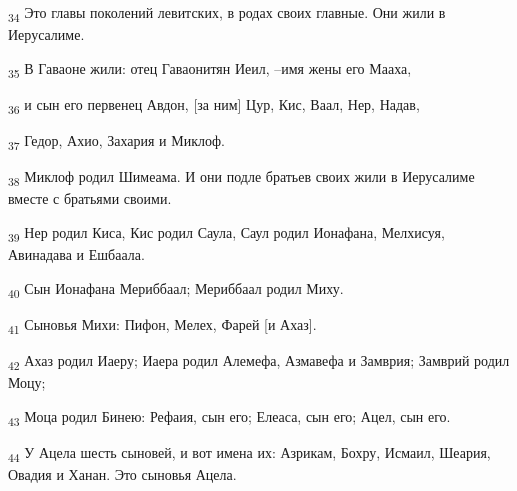 \begin{tcolorbox}
\textsubscript{34} Это главы поколений левитских, в родах своих главные. Они жили в Иерусалиме.
\end{tcolorbox}
\begin{tcolorbox}
\textsubscript{35} В Гаваоне жили: отец Гаваонитян Иеил, --имя жены его Мааха,
\end{tcolorbox}
\begin{tcolorbox}
\textsubscript{36} и сын его первенец Авдон, [за ним] Цур, Кис, Ваал, Нер, Надав,
\end{tcolorbox}
\begin{tcolorbox}
\textsubscript{37} Гедор, Ахио, Захария и Миклоф.
\end{tcolorbox}
\begin{tcolorbox}
\textsubscript{38} Миклоф родил Шимеама. И они подле братьев своих жили в Иерусалиме вместе с братьями своими.
\end{tcolorbox}
\begin{tcolorbox}
\textsubscript{39} Нер родил Киса, Кис родил Саула, Саул родил Ионафана, Мелхисуя, Авинадава и Ешбаала.
\end{tcolorbox}
\begin{tcolorbox}
\textsubscript{40} Сын Ионафана Мериббаал; Мериббаал родил Миху.
\end{tcolorbox}
\begin{tcolorbox}
\textsubscript{41} Сыновья Михи: Пифон, Мелех, Фарей [и Ахаз].
\end{tcolorbox}
\begin{tcolorbox}
\textsubscript{42} Ахаз родил Иаеру; Иаера родил Алемефа, Азмавефа и Замврия; Замврий родил Моцу;
\end{tcolorbox}
\begin{tcolorbox}
\textsubscript{43} Моца родил Бинею: Рефаия, сын его; Елеаса, сын его; Ацел, сын его.
\end{tcolorbox}
\begin{tcolorbox}
\textsubscript{44} У Ацела шесть сыновей, и вот имена их: Азрикам, Бохру, Исмаил, Шеария, Овадия и Ханан. Это сыновья Ацела.
\end{tcolorbox}
